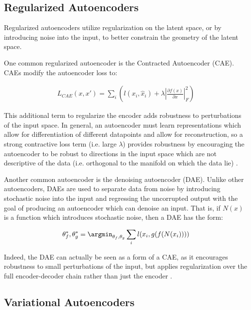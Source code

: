 \subsection{Regularized Autoencoders}

Regularized autoencoders utilize regularization on the latent space,
or by introducing noise into the input, to better constrain the
geometry of the latent space.

One common regularized autoencoder is the Contracted Autoencoder
(CAE). CAEs modify the autoencoder loss to:

\begin{align*}
    L_{CAE}(x, x') = \sum_i \left ( l(x_i, \hat{x}_i) + \lambda \left | \frac{\partial f(x)}{\partial x} \right |^2_F \right )
\end{align*}

This additional term to regularize the encoder adds robustness to
perturbations of the input space. In general, an autoencoder must
learn representations which allow for differentiation of different
datapoints and allow for reconstruction, so a strong contractive loss
term (i.e. large $\lambda$) provides robustness by encouraging the
autoencoder to be robust to directions in the input space which are
not descriptive of the data (i.e. orthogonal to the manifold on which
the data lie) \cite{alain2014regularized}.


Another common autoencoder is the denoising autoencoder (DAE). Unlike
other autoencoders, DAEs are used to separate data from noise by
introducing stochastic noise into the input and regressing the
uncorrupted output with the goal of producing an autoencoder which
can denoise an input. That is, if $N(x)$ is a function which
introduces stochastic noise, then a DAE has the form:

\begin{align*}
    \theta_f^*, \theta_g^* = \argmin_{\theta_f, \theta_g} \sum_i l(x_i, g(f(N(x_i))))
\end{align*}

Indeed, the DAE can actually be seen as a form of a CAE, as it
encourages robustness to small perturbations of the input, but
applies regularization over the full encoder-decoder chain rather
than just the encoder \cite{alain2014regularized}.



\subsection{Variational Autoencoders}

